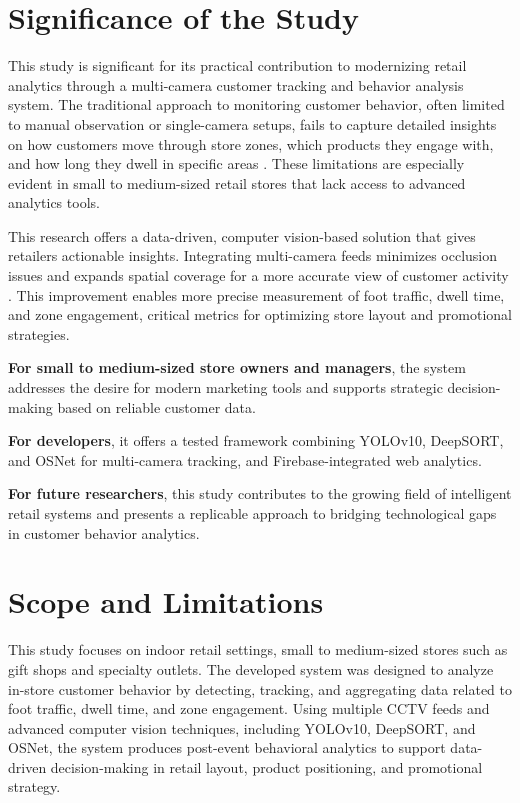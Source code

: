 {\section{Significance of the Study}

This study is significant for its practical contribution to modernizing retail analytics through a multi-camera customer tracking and behavior analysis system. The traditional approach to monitoring customer behavior, often limited to manual observation or single-camera setups, fails to capture detailed insights on how customers move through store zones, which products they engage with, and how long they dwell in specific areas \citep{Amosa2023,Chen2022}. These limitations are especially evident in small to medium-sized retail stores that lack access to advanced analytics tools.

This research offers a data-driven, computer vision-based solution that gives retailers actionable insights. Integrating multi-camera feeds minimizes occlusion issues and expands spatial coverage for a more accurate view of customer activity \citep{Li2023}. This improvement enables more precise measurement of foot traffic, dwell time, and zone engagement, critical metrics for optimizing store layout and promotional strategies.

\textbf{For small to medium-sized store owners and managers}, the system addresses the desire for modern marketing tools and supports strategic decision-making based on reliable customer data.

\textbf{For developers}, it offers a tested framework combining YOLOv10, DeepSORT, and OSNet for multi-camera tracking, and Firebase-integrated web analytics.
	
\textbf{For future researchers}, this study contributes to the growing field of intelligent retail systems and presents a replicable approach to bridging technological gaps in customer behavior analytics.

\section{Scope and Limitations}

This study focuses on indoor retail settings, small to medium-sized stores such as gift shops and specialty outlets. The developed system was designed to analyze in-store customer behavior by detecting, tracking, and aggregating data related to foot traffic, dwell time, and zone engagement. Using multiple CCTV feeds and advanced computer vision techniques, including YOLOv10, DeepSORT, and OSNet, the system produces post-event behavioral analytics to support data-driven decision-making in retail layout, product positioning, and promotional strategy.

}
